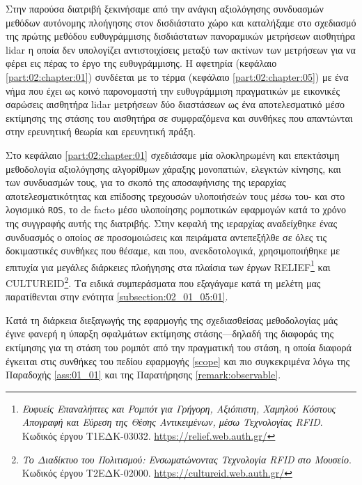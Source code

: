 Στην παρούσα διατριβή ξεκινήσαμε από την ανάγκη αξιολόγησης συνδυασμών μεθόδων
αυτόνομης πλοήγησης στον δισδιάστατο χώρο και καταλήξαμε στο σχεδιασμό της
πρώτης μεθόδου ευθυγράμμισης δισδιάστατων πανοραμικών μετρήσεων αισθητήρα lidar
η οποία δεν υπολογίζει αντιστοιχίσεις μεταξύ των ακτίνων των μετρήσεων για να
φέρει εις πέρας το έργο της ευθυγράμμισης. Η αφετηρία (κεφάλαιο
\ref{part:02:chapter:01}) συνδέεται με το τέρμα (κεφάλαιο
\ref{part:02:chapter:05}) με ένα νήμα που έχει ως κοινό παρονομαστή την
ευθυγράμμιση πραγματικών με εικονικές σαρώσεις αισθητήρα lidar μετρήσεων δύο
διαστάσεων ως ένα αποτελεσματικό μέσο εκτίμησης της στάσης του αισθητήρα σε
συμφραζόμενα και συνθήκες που απαντώνται στην ερευνητική θεωρία και ερευνητική
πράξη.

Στο κεφάλαιο \ref{part:02:chapter:01} σχεδιάσαμε μία ολοκληρωμένη και
επεκτάσιμη μεθοδολογία αξιολόγησης αλγορίθμων χάραξης μονοπατιών, ελεγκτών
κίνησης, και των συνδυασμών τους, για το σκοπό της αποσαφήνισης της ιεραρχίας
αποτελεσματικότητας και επίδοσης τρεχουσών υλοποιήσεών τους μέσω του- και στο
λογισμικό \texttt{ROS}, το de facto μέσο υλοποίησης ρομποτικών εφαρμογών κατά
το χρόνο της συγγραφής αυτής της διατριβής. Στην κεφαλή της ιεραρχίας
αναδείχθηκε ένας συνδυασμός ο οποίος σε προσομοιώσεις και πειράματα αντεπεξήλθε
σε όλες τις δοκιμαστικές συνθήκες που θέσαμε, και που, ανεκδοτολογικά,
χρησιμοποιήθηκε με επιτυχία για μεγάλες διάρκειες πλοήγησης στα πλαίσια των
έργων RELIEF\footnote{\textit{Ευφυείς Επαναλήπτες και Ρομπότ για Γρήγορη,
Αξιόπιστη, Χαμηλού Κόστους Απογραφή και Εύρεση της Θέσης Αντικειμένων, μέσω
Τεχνολογίας RFID}. Κωδικός έργου Τ1ΕΔΚ-03032.
\url{https://relief.web.auth.gr/}} και CULTUREID\footnote{\textit{Το Διαδίκτυο
του Πολιτισμού: Ενσωματώνοντας Τεχνολογία RFID στο Μουσείο}. Κωδικός έργου
Τ2ΕΔΚ-02000. \url{https://cultureid.web.auth.gr/}}. Τα ειδικά συμπεράσματα που
εξαγάγαμε κατά τη μελέτη μας παρατίθενται στην ενότητα
\ref{subsection:02_01_05:01}.

Κατά τη διάρκεια διεξαγωγής της εφαρμογής της σχεδιασθείσας μεθοδολογίας μάς
έγινε φανερή η ύπαρξη σφαλμάτων εκτίμησης στάσης---δηλαδή της διαφοράς της
εκτίμησης για τη στάση του ρομπότ από την πραγματική του στάση, η οποία διαφορά
έγκειται στις συνθήκες του πεδίου εφαρμογής \ref{scope} και πιο συγκεκριμένα
λόγω της Παραδοχής \ref{ass:01_01} και της Παρατήρησης \ref{remark:observable}.

